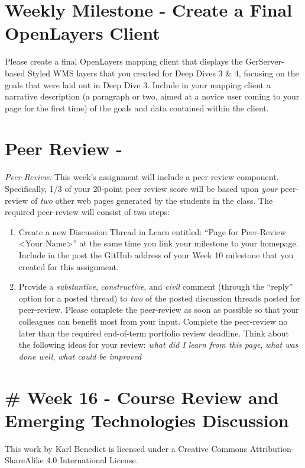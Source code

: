 \documentclass[]{book}
\begin{document}
\section{Weekly Milestone - Create a Final OpenLayers
Client}\label{weekly-milestone---create-a-final-openlayers-client}

Please create a final OpenLayers mapping client that displays the
GerServer-based Styled WMS layers that you created for Deep Dives 3 \&
4, focusing on the goals that were laid out in Deep Dive 3. Include in
your mapping client a narrative description (a paragraph or two, aimed
at a novice user coming to your page for the first time) of the goals
and data contained within the client.

\section{Peer Review -}\label{week15-peerReview}

\emph{Peer Review:} This week's assignment will include a peer review
component. Specifically, 1/3 of your 20-point peer review score will be
based upon \emph{your} peer-review of \emph{two} other web pages
generated by the students in the class. The required peer-review will
consist of two steps:

\begin{enumerate}
\def\labelenumi{\arabic{enumi}.}
\item
  Create a new Discussion Thread in Learn entitled: ``Page for
  Peer-Review \textless{}Your Name\textgreater{}'' at the same time you
  link your milestone to your homepage. Include in the post the GitHub
  address of your Week 10 milestone that you created for this
  assignment.
\item
  Provide a \emph{substantive}, \emph{constructive}, and \emph{civil}
  comment (through the ``reply'' option for a posted thread) to
  \emph{two} of the posted discussion threads posted for peer-review.
  Please complete the peer-review as soon as possible so that your
  colleagues can benefit most from your input. Complete the peer-review
  no later than the required end-of-term portfolio review deadline.
  Think about the following ideas for your review: \emph{what did I
  learn from this page}, \emph{what was done well}, \emph{what could be
  improved}
\end{enumerate}

\section{\# Week 16 - Course Review and Emerging Technologies
Discussion}\label{week-16---course-review-and-emerging-technologies-discussion}

This work by {Karl Benedict} is licensed under a Creative Commons
Attribution-ShareAlike 4.0 International License.
\end{document}
